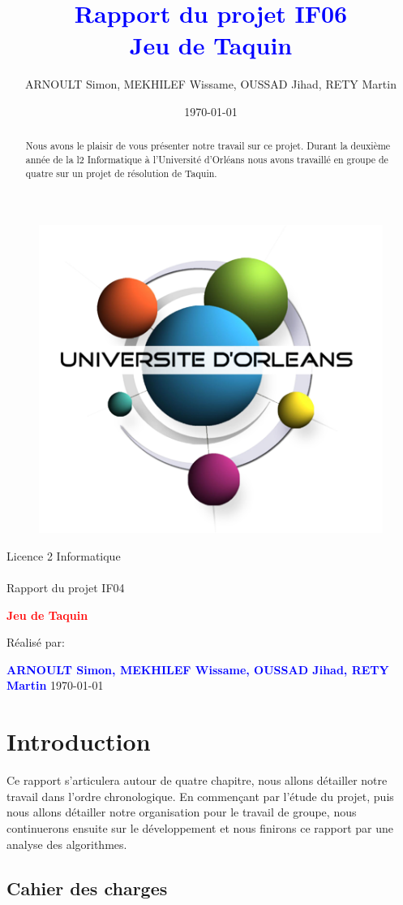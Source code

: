 \documentclass[a4paper,twoside,12pt]{report}
\title{\textcolor{blue}{\Large Rapport du projet IF06}\\\textcolor{blue}{\Large Jeu de Taquin}}
\author{ARNOULT Simon, MEKHILEF Wissame, OUSSAD Jihad, RETY Martin \date{\today}}
\begin{document}
\thispagestyle{empty}
%
\begin{figure}[H]
\includegraphics[width=0.2\linewidth]{Logo-univ-orleans.png}

\end{figure}
\vspace{2cm}
%
\begin{center}
{\Huge Licence 2 Informatique\\\ \\Rapport du projet IF04}
\par\vspace{1.4cm}

{\Huge\bf \textcolor{red}{\bf Jeu de Taquin}}
\par\vspace{1.6cm}

{\Large       Réalisé par:}
\par\vspace{1.3cm}
{\large\bf \textcolor{blue}{ARNOULT Simon, MEKHILEF Wissame, OUSSAD Jihad, RETY Martin}}
\vfill
\today
\end{center}
\newpage
\pagestyle{fancy}

\begin{abstract}
%
Nous avons le plaisir de vous présenter notre travail sur ce projet. Durant la deuxième année de la l2 Informatique
à l'Université d'Orléans nous avons travaillé en groupe de quatre sur un projet de résolution de Taquin.
\end{abstract}
 
\newpage
\tableofcontents
\listoffigures
\newpage

\chapter{Introduction}
Ce rapport s'articulera autour de quatre chapitre, nous allons détailler notre travail dans l'ordre chronologique. En commençant par l'étude
du projet, puis nous allons détailler notre organisation pour le travail de groupe, nous continuerons ensuite sur le développement et nous
finirons ce rapport par une analyse des algorithmes.
%
\section{Cahier des charges}
\end{document}
